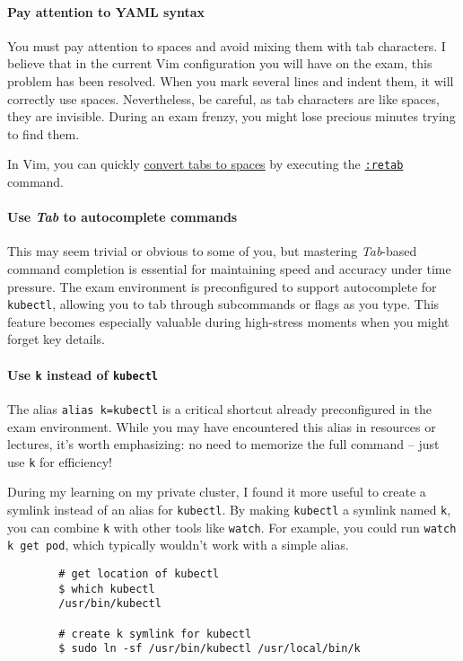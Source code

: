 \paragraph{Pay attention to YAML syntax} You must pay attention to spaces and avoid mixing them with tab characters. I believe that in the current Vim configuration you will have on the exam, this problem has been resolved. When you mark several lines and indent them, it will correctly use spaces. Nevertheless, be careful, as tab characters are like spaces, they are invisible. During an exam frenzy, you might lose precious minutes trying to find them.

\noindent In Vim, you can quickly \underline{convert tabs to spaces} by executing the \href{https://vi.stackexchange.com/a/496/32119}{\texttt{:retab}} command.

\paragraph{Use \textit{Tab} to autocomplete commands}  
This may seem trivial or obvious to some of you, but mastering \textit{Tab}-based command completion is essential for maintaining speed and accuracy under time pressure. The exam environment is preconfigured to support autocomplete for \texttt{kubectl}, allowing you to tab through subcommands or flags as you type. This feature becomes especially valuable during high-stress moments when you might forget key details.

\paragraph{Use \texttt{k} instead of \texttt{kubectl}}  
The alias \texttt{alias k=kubectl} is a critical shortcut already preconfigured in the exam environment. While you may have encountered this alias in resources or lectures, it’s worth emphasizing: no need to memorize the full command -- just use \texttt{k} for efficiency!

\begin{tip}{}
	During my learning on my private cluster, I found it more useful to create a symlink instead of an alias for \texttt{kubectl}. By making \texttt{kubectl} a symlink named \texttt{k}, you can combine \texttt{k} with other tools like \texttt{watch}. For example, you could run \texttt{watch k get pod}, which typically wouldn't work with a simple alias.

	
	\begin{verbatim}
		# get location of kubectl
		$ which kubectl
		/usr/bin/kubectl
		
		# create k symlink for kubectl
		$ sudo ln -sf /usr/bin/kubectl /usr/local/bin/k
	\end{verbatim}
\end{tip}

